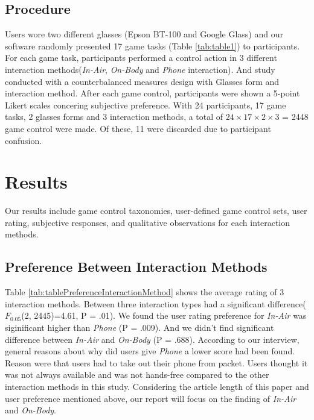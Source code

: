 \documentclass{sigchi}
\begin{document}
    \subsection {Procedure}
    Users wore two different glasses (Epson BT-100 and Google Glass) and our software randomly presented 17 game tasks (Table \ref{tab:table1}) to participants. For each game task, participants performed a control action in 3 different interaction methods(\emph{In-Air}, \emph{On-Body} and \emph{Phone} interaction). And study conducted with a counterbalanced measures design with Glasses form and interaction method. After each game control, participants were shown a 5-point Likert scales concering subjective preference. With 24 participants, 17 game tasks, 2 glasses forms and 3 interaction methods, a total of $24 \times 17 \times 2 \times 3$ = 2448 game control were made. Of these, 11 were discarded due to participant confusion. 

\section{Results}

Our results include game control taxonomies, user-defined game control sets, user rating, subjective responses, and qualitative observations for each interaction methods.

  \subsection{Preference Between Interaction Methods}
  Table \ref{tab:tablePreferenceInteractionMethod} shows the average rating of 3 interaction methods. Between three interaction types had a significant difference($F_{0.05}$(2, 2445)=4.61, P = .01). We found the user rating preference for \emph{In-Air} was siginificant higher than \emph{Phone} (P = .009). And we didn't find significant difference between \emph{In-Air} and \emph{On-Body} (P = .688).
  According to our interview, general reasons about why did users give \emph{Phone} a lower score had been found. Reason were that users had to take out their phone from packet. Users thought it was not always available and was not hands-free compared to the other interaction methods in this study. Considering the article length of this paper and user preference mentioned above, our report will focus on the finding of \emph{In-Air} and \emph{On-Body}.
\end{document}
